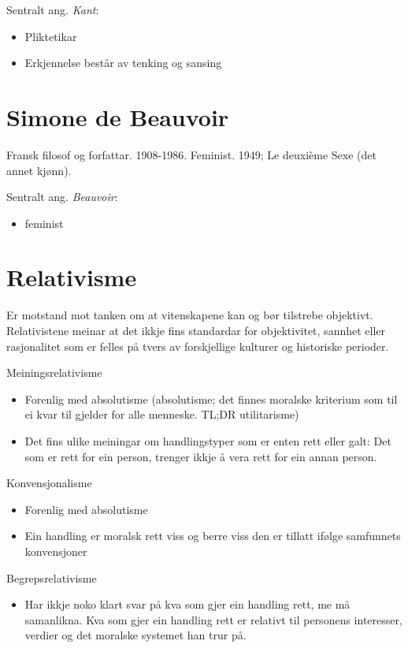 \documentclass[a4paper]{IEEEtran}
\begin{document}
Sentralt ang. \textit{Kant}:
\begin{itemize}\bigskip
    \item Pliktetikar
    \item Erkjennelse består av tenking og sansing
\end{itemize}\bigskip

\section{Simone de Beauvoir}
\label{beauvoir}\bigskip

Fransk filosof og forfattar. 1908-1986. Feminist. 1949; Le deuxième Sexe (det annet kjønn). 
\bigskip

Sentralt ang. \textit{Beauvoir}:
\begin{itemize}\bigskip
     \item feminist
\end{itemize}\bigskip

\bigskip
\section{Relativisme}
\label{relativisme}
Er motstand mot tanken om at vitenskapene kan og bør tilstrebe objektivt. Relativistene meinar at det ikkje fins standardar for objektivitet, sannhet eller rasjonalitet som er felles på tvers av forskjellige kulturer og historiske perioder.
\bigskip

Meiningsrelativisme\bigskip
\begin{itemize}
    \item Forenlig med absolutisme (absolutisme; det finnes moralske kriterium som til ei kvar til gjelder for alle menneske. TL;DR utilitarisme)
    \item Det fins ulike meiningar om handlingstyper som er enten rett eller galt: Det som er rett for ein person, trenger ikkje å vera rett for ein annan person.
\end{itemize}\bigskip

Konvensjonalisme\bigskip
\begin{itemize}
    \item Forenlig med absolutisme
    \item Ein handling er moralsk rett viss og berre viss den er tillatt ifølge samfunnets konvensjoner
\end{itemize}\bigskip

Begrepsrelativisme\bigskip
\begin{itemize}
    \item Har ikkje noko klart svar på kva som gjer ein handling rett, me må samanlikna. Kva som gjer ein handling rett er relativt til personens interesser, verdier og det moralske systemet han trur på.
\end{itemize}
\end{document}
